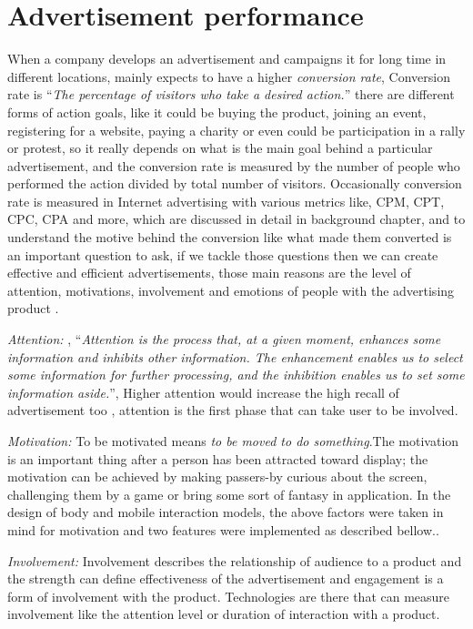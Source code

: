 \section{Advertisement performance}
When a company develops an advertisement and campaigns it for long time in different locations, mainly expects to have a higher \emph{conversion rate}, Conversion rate is ``\emph{The percentage of visitors who take a desired action.}''\cite{convrate} there are different forms of action goals, like it could be buying the product, joining an event, registering for a website, paying a charity or even could be participation in a rally or protest, so it really depends on what is the main goal behind a particular advertisement, and the conversion rate is measured by the number of people who performed the action divided by total number of visitors. Occasionally conversion rate is measured in Internet advertising with various metrics like, CPM, CPT, CPC, CPA and more, which are discussed in detail in background chapter, and to understand the motive behind the conversion like what made them converted is an important question to ask, if we tackle those questions then we can create effective and efficient advertisements, those main reasons are the level of attention, motivations, involvement and emotions of people with the advertising product \cite{pervasiv_ad}.

\emph{Attention: }, ``\emph{Attention is the process that, at a given moment, enhances some information and inhibits other information. The enhancement enables us to select some information for further processing, and the inhibition enables us to set some information aside.}''\cite{Attention}, Higher attention would increase the high recall of advertisement too \cite{add_effectivenss}, attention is the first phase that can take user to be involved.

\emph{Motivation: }
To be motivated means \emph{to be moved to do something}\cite{motiv}.The motivation is an important thing after a person has been attracted toward display; the motivation can be achieved by making passers-by curious about the screen, challenging them by a game or bring some sort of fantasy in application. In the design of body and mobile interaction models, the above factors were taken in mind for motivation and two features were implemented as described bellow.\cite{ toward_motivation}. 

\emph{Involvement: } Involvement describes the relationship of audience to a product and the strength can define effectiveness of the advertisement and engagement is a form of involvement with the product. Technologies are there that can measure involvement like the attention level or duration of interaction with a product.

